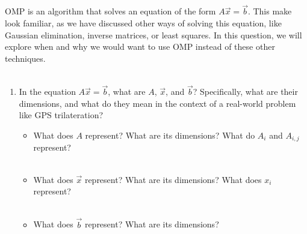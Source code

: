 \\ \\

OMP is an algorithm that solves an equation of the form $A\vec{x} = \vec{b}$.
This make look familiar, as we have discussed other ways of solving this equation,
like Gaussian elimination, inverse matrices, or least squares.
In this question, we will explore when and why we would want to use OMP instead of
these other techniques.
\\ \\

\begin{enumerate}
    \item In the equation $A\vec{x} = \vec{b}$, what are $A$, $\vec{x}$, and $\vec{b}$?
    Specifically, what are their dimensions, and what do they mean in the context of
    a real-world problem like GPS trilateration? 
    \begin{itemize}
        \item What does $A$ represent? What are its dimensions? What do $A_i$ and $A_{i,j}$ represent?
        \answerbox{0.5cm}
        \\ \\

        \item What does $\vec{x}$ represent? What are its dimensions? What does $x_i$ represent?
        \answerbox{0.5cm}
        \\ \\

        \item What does $\vec{b}$ represent? What are its dimensions?
        \answerbox{0.5cm}
        \\ \\
    \end{itemize}


\end{enumerate}
